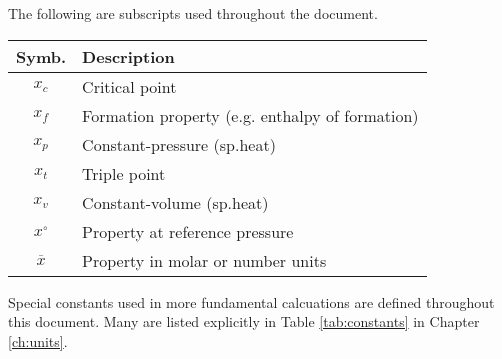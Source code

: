 The following are subscripts used throughout the document.

\vspace{1em}
\begin{tabular}{|cl|}
\hline
Symb. & Description\\
\hline
$x_c$ & Critical point\\
$x_f$ & Formation property (e.g. enthalpy of formation)\\
$x_p$ & Constant-pressure (sp.heat)\\
$x_t$ & Triple point\\
$x_v$ & Constant-volume (sp.heat)\\
$x^\circ$ & Property at reference pressure\\
$\overline{x}$ & Property in molar or number units\\
\hline
\end{tabular}

Special constants used in more fundamental calcuations are defined throughout this document.  Many are listed explicitly in Table \ref{tab:constants} in Chapter \ref{ch:units}.
